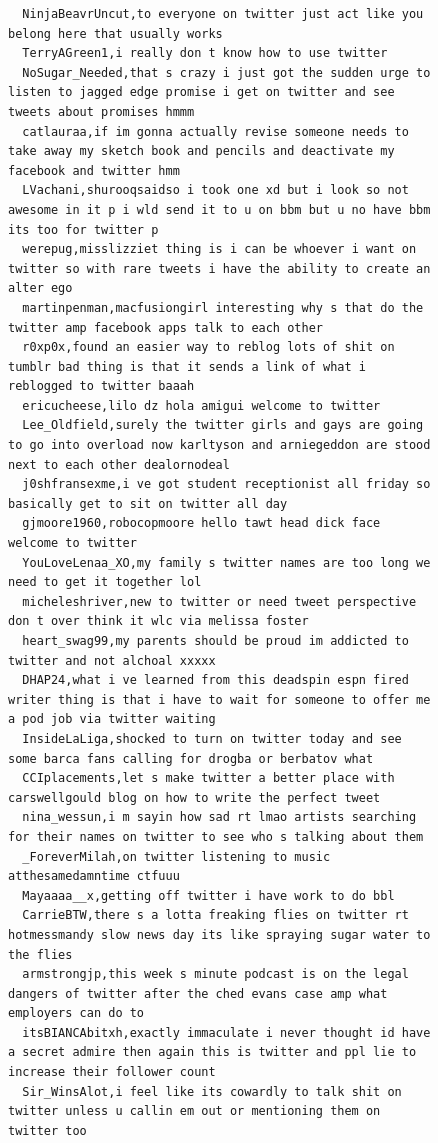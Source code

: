 \begin{figure}[htpb]
\begin{verbatim}
  NinjaBeavrUncut,to everyone on twitter just act like you belong here that usually works
  TerryAGreen1,i really don t know how to use twitter
  NoSugar_Needed,that s crazy i just got the sudden urge to listen to jagged edge promise i get on twitter and see tweets about promises hmmm
  catlauraa,if im gonna actually revise someone needs to take away my sketch book and pencils and deactivate my facebook and twitter hmm
  LVachani,shurooqsaidso i took one xd but i look so not awesome in it p i wld send it to u on bbm but u no have bbm its too for twitter p
  werepug,misslizziet thing is i can be whoever i want on twitter so with rare tweets i have the ability to create an alter ego
  martinpenman,macfusiongirl interesting why s that do the twitter amp facebook apps talk to each other
  r0xp0x,found an easier way to reblog lots of shit on tumblr bad thing is that it sends a link of what i reblogged to twitter baaah
  ericucheese,lilo dz hola amigui welcome to twitter
  Lee_Oldfield,surely the twitter girls and gays are going to go into overload now karltyson and arniegeddon are stood next to each other dealornodeal
  j0shfransexme,i ve got student receptionist all friday so basically get to sit on twitter all day
  gjmoore1960,robocopmoore hello tawt head dick face welcome to twitter
  YouLoveLenaa_XO,my family s twitter names are too long we need to get it together lol
  micheleshriver,new to twitter or need tweet perspective don t over think it wlc via melissa foster
  heart_swag99,my parents should be proud im addicted to twitter and not alchoal xxxxx
  DHAP24,what i ve learned from this deadspin espn fired writer thing is that i have to wait for someone to offer me a pod job via twitter waiting
  InsideLaLiga,shocked to turn on twitter today and see some barca fans calling for drogba or berbatov what
  CCIplacements,let s make twitter a better place with carswellgould blog on how to write the perfect tweet
  nina_wessun,i m sayin how sad rt lmao artists searching for their names on twitter to see who s talking about them
  _ForeverMilah,on twitter listening to music atthesamedamntime ctfuuu
  Mayaaaa__x,getting off twitter i have work to do bbl
  CarrieBTW,there s a lotta freaking flies on twitter rt hotmessmandy slow news day its like spraying sugar water to the flies
  armstrongjp,this week s minute podcast is on the legal dangers of twitter after the ched evans case amp what employers can do to
  itsBIANCAbitxh,exactly immaculate i never thought id have a secret admire then again this is twitter and ppl lie to increase their follower count
  Sir_WinsAlot,i feel like its cowardly to talk shit on twitter unless u callin em out or mentioning them on twitter too

\end{verbatim}
\end{figure}

